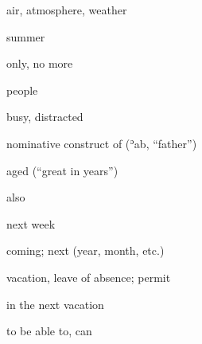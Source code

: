 \documentclass[avery5371,grid,frame]{flashcards}
\begin{document}
\begin{flashcard}{\LARGE air, atmosphere, weather}
\LARGE {}
\end{flashcard}
\begin{flashcard}{\LARGE summer}
\LARGE {}
\end{flashcard}
\begin{flashcard}{\LARGE only, no more}
\LARGE {}
\end{flashcard}
\begin{flashcard}{\LARGE people}
\LARGE {}
\end{flashcard}
\begin{flashcard}{\LARGE busy, distracted}
\LARGE {}
\end{flashcard}
\begin{flashcard}{\LARGE nominative construct of  (ʾab, “father”)}
\LARGE {}
\end{flashcard}
\begin{flashcard}{\LARGE aged (``great in years'')}
\LARGE {}
\end{flashcard}
\begin{flashcard}{\LARGE also}
\LARGE {}
\end{flashcard}
\begin{flashcard}{\LARGE next week}
\LARGE {}
\end{flashcard}
\begin{flashcard}{\LARGE coming; next (year, month, etc.)}
\LARGE {}
\end{flashcard}
\begin{flashcard}{\LARGE vacation, leave of absence; permit}
\LARGE {}
\end{flashcard}
\begin{flashcard}{\LARGE in the next vacation}
\LARGE {}
\end{flashcard}
\begin{flashcard}{\LARGE to be able to, can}
\LARGE {}
\end{flashcard}
\end{document}
